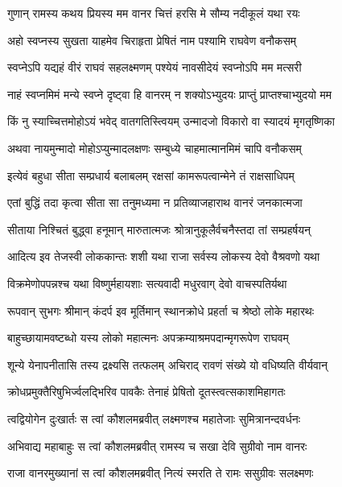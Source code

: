 \twolineshloka
{गुणान् रामस्य कथय प्रियस्य मम वानर}
{चित्तं हरसि मे सौम्य नदीकूलं यथा रयः} %

\twolineshloka
{अहो स्वप्नस्य सुखता याहमेव चिराहृता}
{प्रेषितं नाम पश्यामि राघवेण वनौकसम्} %

\twolineshloka
{स्वप्नेऽपि यद्यहं वीरं राघवं सहलक्ष्मणम्}
{पश्येयं नावसीदेयं स्वप्नोऽपि मम मत्सरी} %

\twolineshloka
{नाहं स्वप्नमिमं मन्ये स्वप्ने दृष्ट्वा हि वानरम्}
{न शक्योऽभ्युदयः प्राप्तुं प्राप्तश्चाभ्युदयो मम} %

\twolineshloka
{किं नु स्याच्चित्तमोहोऽयं भवेद् वातगतिस्त्वियम्}
{उन्मादजो विकारो वा स्यादयं मृगतृष्णिका} %

\twolineshloka
{अथवा नायमुन्मादो मोहोऽप्युन्मादलक्षणः}
{सम्बुध्ये चाहमात्मानमिमं चापि वनौकसम्} %

\twolineshloka
{इत्येवं बहुधा सीता सम्प्रधार्य बलाबलम्}
{रक्षसां कामरूपत्वान्मेने तं राक्षसाधिपम्} %

\twolineshloka
{एतां बुद्धिं तदा कृत्वा सीता सा तनुमध्यमा}
{न प्रतिव्याजहाराथ वानरं जनकात्मजा} %

\twolineshloka
{सीताया निश्चितं बुद्ध्वा हनूमान् मारुतात्मजः}
{श्रोत्रानुकूलैर्वचनैस्तदा तां सम्प्रहर्षयन्} %

\twolineshloka
{आदित्य इव तेजस्वी लोककान्तः शशी यथा}
{राजा सर्वस्य लोकस्य देवो वैश्रवणो यथा} %

\twolineshloka
{विक्रमेणोपपन्नश्च यथा विष्णुर्महायशाः}
{सत्यवादी मधुरवाग् देवो वाचस्पतिर्यथा} %

\twolineshloka
{रूपवान् सुभगः श्रीमान् कंदर्प इव मूर्तिमान्}
{स्थानक्रोधे प्रहर्ता च श्रेष्ठो लोके महारथः} %

\twolineshloka
{बाहुच्छायामवष्टब्धो यस्य लोको महात्मनः}
{अपक्रम्याश्रमपदान्मृगरूपेण राघवम्} %

\twolineshloka
{शून्ये येनापनीतासि तस्य द्रक्ष्यसि तत्फलम्}
{अचिराद् रावणं संख्ये यो वधिष्यति वीर्यवान्} %

\twolineshloka
{क्रोधप्रमुक्तैरिषुभिर्ज्वलद्भिरिव पावकैः}
{तेनाहं प्रेषितो दूतस्त्वत्सकाशमिहागतः} %

\twolineshloka
{त्वद्वियोगेन दुःखार्तः स त्वां कौशलमब्रवीत्}
{लक्ष्मणश्च महातेजाः सुमित्रानन्दवर्धनः} %

\twolineshloka
{अभिवाद्य महाबाहुः स त्वां कौशलमब्रवीत्}
{रामस्य च सखा देवि सुग्रीवो नाम वानरः} %

\twolineshloka
{राजा वानरमुख्यानां स त्वां कौशलमब्रवीत्}
{नित्यं स्मरति ते रामः ससुग्रीवः सलक्ष्मणः} %

